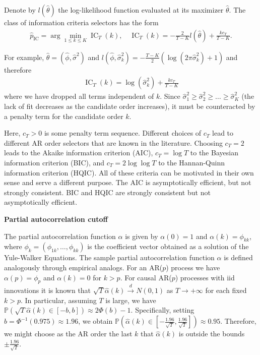 Denote by $l(\hat{\theta})$ the log-likelihood function evaluated at its maximizer $\hat{\theta}$. The class of information criteria selectors has the form
\begin{align*}
    \hat{p}_{\operatorname{IC}}=\arg\min_{1\le k\le K}\operatorname{IC}_T(k),\quad\operatorname{IC}_T(k)=-\frac{2}{T-K}l(\hat{\theta})+\frac{kc_T}{T-K}.
\end{align*}

For example, $\hat{\theta}=(\hat{\phi},\hat{\sigma}^2)$ and $l(\hat{\phi},\hat{\sigma}^2_k)=-\frac{T-K}{2}(\log{(2\pi\hat{\sigma}^2_k)}+1)$ and therefore
\begin{align*}
    \operatorname{IC}_T(k)=\log{(\hat{\sigma}_k^2)}+\frac{kc_T}{T-K}
\end{align*}
where we have dropped all terms independent of $k$. Since $\hat{\sigma}_1^2\ge\hat{\sigma}_2^2\ge\dots\ge\hat{\sigma}_K^2$ (the lack of fit decreases as the candidate order increases), it must be counteracted by a penalty term for the candidate order $k$.

Here, $c_T>0$ is some penalty term sequence. Different choices of $c_T$ lead to different AR order selectors that are known in the literature. Choosing $c_T=2$ leads to the Akaike information criterion (AIC), $c_T=\log{T}$ to the Bayesian information criterion (BIC), and $c_T=2\log{\log{T}}$ to the Hannan-Quinn information criterion (HQIC). All of these criteria can be motivated in their own sense and serve a different purpose. The AIC is asymptotically efficient, but not strongly consistent. BIC and HQIC are strongly consistent but not asymptotically efficient.


\textbf{Partial autocorrelation cutoff}

The partial autocorrelation function $\alpha$ is given by $\alpha(0)=1$ and $\alpha(k)=\phi_{kk}$, where $\phi_k=(\phi_{1k},\dots,\phi_{kk})$ is the coefficient vector obtained as a solution of the Yule-Walker Equations. The sample partial autocorrelation function $\hat{\alpha}$ is defined analogously through empirical analogs. For an AR($p$) process we have $\alpha(p)=\phi_p$ and $\alpha(k)=0$ for $k>p$. For causal AR($p$) processes with iid innovations it is known that $\sqrt{T}\hat{\alpha}(k)\stackrel{d}{\to}N(0,1)$ as $T\to+\infty$ for each fixed $k>p$. In particular, assuming $T$ is large, we have $\mathbb{P}(\sqrt{T}\hat{\alpha}(k)\in[-b,b])\approx2\Phi(b)-1$. Specifically, setting $b=\Phi^{-1}(0.975)\approx1.96$, we obtain $\mathbb{P}(\hat{\alpha}(k)\in[-\frac{1.96}{\sqrt{T}},\frac{1.96}{\sqrt{T}}])\approx0.95$. Therefore, we might choose as the AR order the last $k$ that $\hat\alpha(k)$ is outside the bounds $\pm\frac{1.96}{\sqrt{T}}$.



